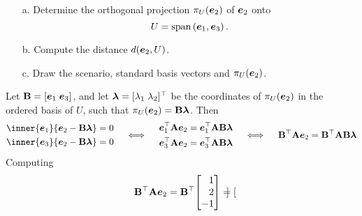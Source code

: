\documentclass[11pt]{article}
\begin{document}
\begin{enumerate}
          \begin{enumerate}
              \item[a.] Determine the orthogonal projection $\pi_U(\boldsymbol{e}_2)$ of $\boldsymbol{e}_2$ onto
                    \[
                        U = \operatorname{span} \left(\boldsymbol{e}_1, \boldsymbol{e}_3\right).
                    \]

              \item[b.] Compute the distance $d(\boldsymbol{e}_2, U)$.

              \item[c.] Draw the scenario, standard basis vectors and $\pi_U(\boldsymbol{e}_2)$.
          \end{enumerate}

          \vspace{1em}

          Let $\mathbf{B} = [\boldsymbol{e}_1 \; \boldsymbol{e}_3]$, and let $\boldsymbol{\lambda} = [\lambda_1 \; \lambda_2]^\top$
          be the coordinates of $\pi_U(\boldsymbol{e}_2)$ in the ordered basis of $U$, such that
          $\pi_U(\boldsymbol{e}_2) = \mathbf{B} \boldsymbol{\lambda}$.  Then
          \[
              \begin{aligned}
                  \inner{ \vect{e}_1 }{ \vect{e}_2 - \mat{B} \vect{\lambda} } = 0 \\
                  \inner{ \vect{e}_3 }{ \vect{e}_2 - \mat{B} \vect{\lambda} } = 0 \\
              \end{aligned}
              \quad
              \iff
              \quad
              \begin{aligned}
                  \vect{e}_1^\top \mat{A} \vect{e}_2 = \vect{e}_1^\top \mat{A} \mat{B} \vect{\lambda} \\
                  \vect{e}_3^\top \mat{A} \vect{e}_2 = \vect{e}_3^\top \mat{A} \mat{B} \vect{\lambda} \\
              \end{aligned}
              \quad
              \iff
              \quad
              \mat{B}^\top \mat{A} \vect{e}_2 = \mat{B}^\top \mat{A} \mat{B} \vect{\lambda}
          \]
          Computing
          \[
              \mat{B}^\top \mat{A} \vect{e}_2 =
              \mat{B}^\top \!
              \begin{bmatrix*}[r]
                  1 \\ 2 \\ -1
              \end{bmatrix*}
              =
              \begin{bmatrix*}[r]

\end{bmatrix*}\]
\end{enumerate}
\end{document}
